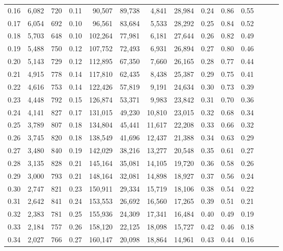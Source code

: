 \begin{tabular}{rrrrrrrrrrrrrr}
0.16 &  6,082 &  720 &  0.11 &   90,507 &   89,738 &   4,841 &  28,984 &  0.24 &  0.86 &      0.55 \\
0.17 &  6,054 &  692 &  0.10 &   96,561 &   83,684 &   5,533 &  28,292 &  0.25 &  0.84 &      0.52 \\
0.18 &  5,703 &  648 &  0.10 &  102,264 &   77,981 &   6,181 &  27,644 &  0.26 &  0.82 &      0.49 \\
0.19 &  5,488 &  750 &  0.12 &  107,752 &   72,493 &   6,931 &  26,894 &  0.27 &  0.80 &      0.46 \\
0.20 &  5,143 &  729 &  0.12 &  112,895 &   67,350 &   7,660 &  26,165 &  0.28 &  0.77 &      0.44 \\
0.21 &  4,915 &  778 &  0.14 &  117,810 &   62,435 &   8,438 &  25,387 &  0.29 &  0.75 &      0.41 \\
0.22 &  4,616 &  753 &  0.14 &  122,426 &   57,819 &   9,191 &  24,634 &  0.30 &  0.73 &      0.39 \\
0.23 &  4,448 &  792 &  0.15 &  126,874 &   53,371 &   9,983 &  23,842 &  0.31 &  0.70 &      0.36 \\
0.24 &  4,141 &  827 &  0.17 &  131,015 &   49,230 &  10,810 &  23,015 &  0.32 &  0.68 &      0.34 \\
0.25 &  3,789 &  807 &  0.18 &  134,804 &   45,441 &  11,617 &  22,208 &  0.33 &  0.66 &      0.32 \\
0.26 &  3,745 &  820 &  0.18 &  138,549 &   41,696 &  12,437 &  21,388 &  0.34 &  0.63 &      0.29 \\
0.27 &  3,480 &  840 &  0.19 &  142,029 &   38,216 &  13,277 &  20,548 &  0.35 &  0.61 &      0.27 \\
0.28 &  3,135 &  828 &  0.21 &  145,164 &   35,081 &  14,105 &  19,720 &  0.36 &  0.58 &      0.26 \\
0.29 &  3,000 &  793 &  0.21 &  148,164 &   32,081 &  14,898 &  18,927 &  0.37 &  0.56 &      0.24 \\
0.30 &  2,747 &  821 &  0.23 &  150,911 &   29,334 &  15,719 &  18,106 &  0.38 &  0.54 &      0.22 \\
0.31 &  2,642 &  841 &  0.24 &  153,553 &   26,692 &  16,560 &  17,265 &  0.39 &  0.51 &      0.21 \\
0.32 &  2,383 &  781 &  0.25 &  155,936 &   24,309 &  17,341 &  16,484 &  0.40 &  0.49 &      0.19 \\
0.33 &  2,184 &  757 &  0.26 &  158,120 &   22,125 &  18,098 &  15,727 &  0.42 &  0.46 &      0.18 \\
0.34 &  2,027 &  766 &  0.27 &  160,147 &   20,098 &  18,864 &  14,961 &  0.43 &  0.44 &      0.16 \\

\end{tabular}
